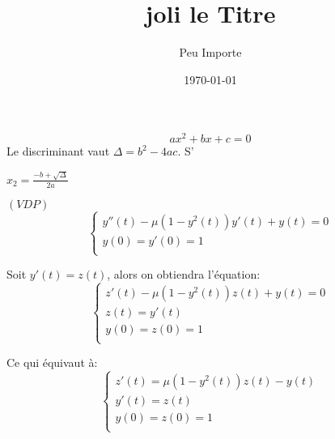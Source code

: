 \documentclass[12pt,two column]{article}
\begin{document}
\title{joli le Titre}
\author{Peu Importe}
\date{\today}
\maketitle
{}


\begin{equation}
ax^2+bx+c=0
\end{equation}
Le discriminant vaut $\Delta=b^2-4ac$. S’

$x_2=\frac{-b+\sqrt\Delta}{2a}$

$(VDP)$
\[
\left\{
\begin{array}{ll}
y''(t)-\mu(1-y^{2}(t))y'(t)+y(t)=0\\
y(0)=y'(0)=1\\
\end{array}
\right.
\]

Soit $y'(t)=z(t)$, alors on obtiendra l'équation:
\[
\left\{
\begin{array}{ll}
z'(t)-\mu(1-y^{2}(t))z(t)+y(t)=0\\
z(t)=y'(t)\\
y(0)=z(0)=1\\
\end{array}
\right.
\]

Ce qui équivaut à:
\[
\left\{
\begin{array}{ll}
z'(t)=\mu(1-y^{2}(t))z(t)-y(t)\\
y'(t)=z(t)\\
y(0)=z(0)=1\\
\end{array}
\right.
\]
\end{document}
